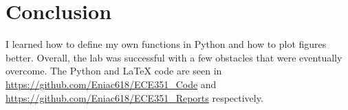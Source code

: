 \documentclass[12pt]{report}
\begin{document}
\section{Conclusion}
I learned how to define my own functions in Python and how to plot figures better. Overall, the lab was successful with a few obstacles that were eventually overcome. The Python and \LaTeX{} code are seen in \url{https://github.com/Eniac618/ECE351_Code} and \url{https://github.com/Eniac618/ECE351_Reports} respectively.
\end{document}
